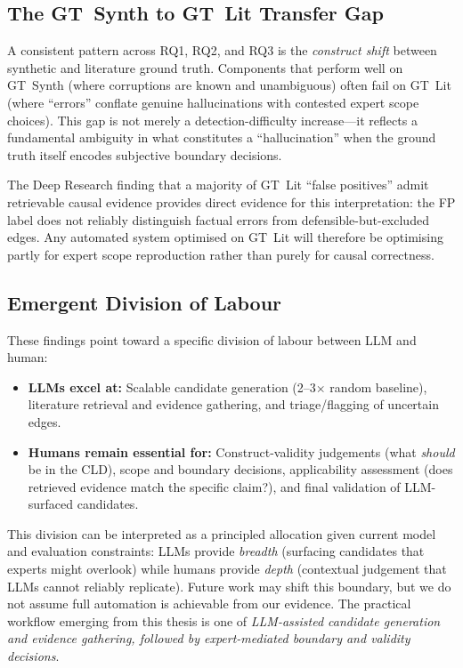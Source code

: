 \subsection{The GT~Synth to GT~Lit Transfer Gap}

A consistent pattern across RQ1, RQ2, and RQ3 is the \emph{construct shift} between synthetic and literature ground truth. Components that perform well on GT~Synth (where corruptions are known and unambiguous) often fail on GT~Lit (where ``errors'' conflate genuine hallucinations with contested expert scope choices). This gap is not merely a detection-difficulty increase---it reflects a fundamental ambiguity in what constitutes a ``hallucination'' when the ground truth itself encodes subjective boundary decisions.

The Deep Research finding that a majority of GT~Lit ``false positives'' admit retrievable causal evidence provides direct evidence for this interpretation: the FP label does not reliably distinguish factual errors from defensible-but-excluded edges. Any automated system optimised on GT~Lit will therefore be optimising partly for expert scope reproduction rather than purely for causal correctness.

\subsection{Emergent Division of Labour}

These findings point toward a specific division of labour between LLM and human:

\begin{itemize}[noitemsep]
    \item \textbf{LLMs excel at:} Scalable candidate generation (2--3$\times$ random baseline), literature retrieval and evidence gathering, and triage/flagging of uncertain edges.
    \item \textbf{Humans remain essential for:} Construct-validity judgements (what \emph{should} be in the CLD), scope and boundary decisions, applicability assessment (does retrieved evidence match the specific claim?), and final validation of LLM-surfaced candidates.
\end{itemize}

This division can be interpreted as a principled allocation given current model and evaluation constraints: LLMs provide \emph{breadth} (surfacing candidates that experts might overlook) while humans provide \emph{depth} (contextual judgement that LLMs cannot reliably replicate). Future work may shift this boundary, but we do not assume full automation is achievable from our evidence. The practical workflow emerging from this thesis is one of \emph{LLM-assisted candidate generation and evidence gathering, followed by expert-mediated boundary and validity decisions}.

